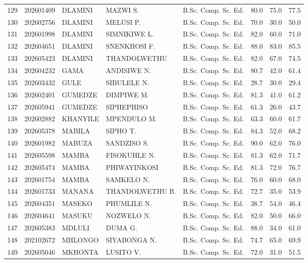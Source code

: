 \documentclass[12pt]{article}
\begin{document}
\begin{longtable}{@{}llllllll@{}}
129 & 202601409 & DLAMINI & MAZWI S. & B.Sc. Comp. Sc. Ed. & 80.0 & 75.0 & 77.5 \\
130 & 202602756 & DLAMINI & MELUSI P. & B.Sc. Comp. Sc. Ed. & 70.0 & 30.0 & 50.0 \\
131 & 202601998 & DLAMINI & SIMNIKIWE L. & B.Sc. Comp. Sc. Ed. & 82.0 & 60.0 & 71.0 \\
132 & 202604651 & DLAMINI & SNENKHOSI F. & B.Sc. Comp. Sc. Ed. & 88.0 & 83.0 & 85.5 \\
133 & 202605423 & DLAMINI & THANDOLWETHU & B.Sc. Comp. Sc. Ed. & 82.0 & 67.0 & 74.5 \\
134 & 202604232 & GAMA & ANDISIWE N. & B.Sc. Comp. Sc. Ed. & 80.7 & 42.0 & 61.4 \\
135 & 202603432 & GULE & SIBULELE N. & B.Sc. Comp. Sc. Ed. & 28.7 & 30.0 & 29.4 \\
136 & 202602401 & GUMEDZE & DIMPIWE M. & B.Sc. Comp. Sc. Ed. & 81.3 & 41.0 & 61.2 \\
137 & 202605941 & GUMEDZE & SIPHEPHISO & B.Sc. Comp. Sc. Ed. & 61.3 & 26.0 & 43.7 \\
138 & 202602882 & KHANYILE & MPENDULO M. & B.Sc. Comp. Sc. Ed. & 63.3 & 60.0 & 61.7 \\
139 & 202605378 & MABILA & SIPHO T. & B.Sc. Comp. Sc. Ed. & 84.3 & 52.0 & 68.2 \\
140 & 202601982 & MABUZA & SANDZISO S. & B.Sc. Comp. Sc. Ed. & 90.0 & 62.0 & 76.0 \\
141 & 202605598 & MAMBA & FISOKUHLE N. & B.Sc. Comp. Sc. Ed. & 81.3 & 62.0 & 71.7 \\
142 & 202605474 & MAMBA & PHIWAYINKOSI & B.Sc. Comp. Sc. Ed. & 81.3 & 72.0 & 76.7 \\
143 & 202601754 & MAMBA & SAMKELO N. & B.Sc. Comp. Sc. Ed. & 76.0 & 60.0 & 68.0 \\
144 & 202601733 & MANANA & THANDOLWETHU B. & B.Sc. Comp. Sc. Ed. & 72.7 & 35.0 & 53.9 \\
145 & 202604351 & MASEKO & PHUMLILE N. & B.Sc. Comp. Sc. Ed. & 38.7 & 54.0 & 46.4 \\
146 & 202604641 & MASUKU & NOZWELO N. & B.Sc. Comp. Sc. Ed. & 82.0 & 50.0 & 66.0 \\
147 & 202605383 & MDLULI & DUMA G. & B.Sc. Comp. Sc. Ed. & 88.0 & 34.0 & 61.0 \\
148 & 202102672 & MHLONGO & SIYABONGA N. & B.Sc. Comp. Sc. Ed. & 74.7 & 65.0 & 69.9 \\
149 & 202605046 & MKHONTA & LUSITO V. & B.Sc. Comp. Sc. Ed. & 72.0 & 31.0 & 51.5 \\

\end{longtable}
\end{document}

